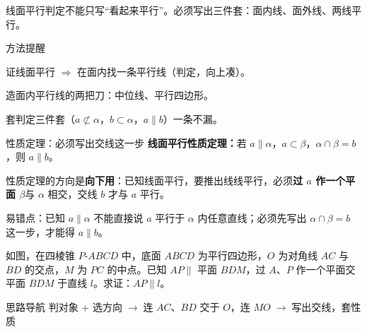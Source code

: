\documentclass{exam-zh}
\begin{document}
\begin{eduMistakeBox}
线面平行判定不能只写“看起来平行”。必须写出三件套：面内线、面外线、两线平行。\end{eduMistakeBox}




\begin{eduSummaryBlock}{\eduIconPin}{方法提醒}
\begin{eduBulletList}
  \item 证线面平行 $\Rightarrow$ 在面内找一条平行线（判定，向上凑）。  \item 造面内平行线的两把刀：中位线、平行四边形。  \item 套判定三件套（$a\not\subset\alpha$，$b\subset\alpha$，$a\parallel b$）一条不漏。\end{eduBulletList}
\end{eduSummaryBlock}



\clearpage
{}


\begin{eduSolutionBox}{性质定理：必须写出交线这一步}
  \begingroup
  \setlength{\parskip}{2.5mm}
\textbf{线面平行性质定理：}若 $a\parallel\alpha$，$a\subset\beta$，$\alpha\cap\beta=b$，则 $a\parallel b$。\par
性质定理的方向是\textbf{向下用}：已知线面平行，要推出线线平行，必须\textbf{过 $a$ 作一个平面 $\beta$}与 $\alpha$ 相交，交线 $b$ 才与 $a$ 平行。\par
易错点：已知 $a\parallel\alpha$ 不能直接说 $a$ 平行于 $\alpha$ 内任意直线；必须先写出 $\alpha\cap\beta=b$ 这一步，才能得 $a\parallel b$。\par
  \endgroup
\end{eduSolutionBox}




\begin{eduProblemBlock}[例题 2]
如图，在四棱锥 $P$-$ABCD$ 中，底面 $ABCD$ 为平行四边形，$O$ 为对角线 $AC$ 与 $BD$ 的交点，$M$ 为 $PC$ 的中点。已知 $AP\parallel$ 平面 $BDM$，过 $A$、$P$ 作一个平面交平面 $BDM$ 于直线 $l$。求证：$AP\parallel l$。

\end{eduProblemBlock}





\begin{eduAuxItem}{思路导航}
判对象 + 选方向$\;\to\;$连 $AC$、$BD$ 交于 $O$，连 $MO$$\;\to\;$写出交线，套性质\end{eduAuxItem}
\end{document}
